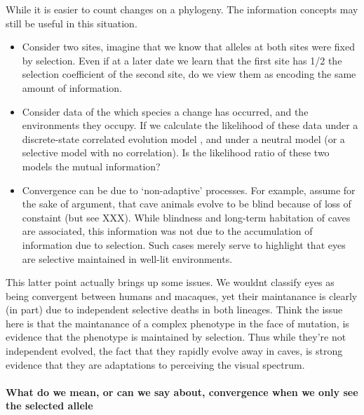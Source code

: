 \documentclass[a4paper,10pt]{article}
\begin{document}
While it is easier to count changes on a phylogeny. The information
concepts may still be useful in this situation.
\begin{itemize}
  \item Consider two sites, imagine that we know that alleles at both sites were
    fixed by selection. Even if at a later date we learn that the
    first site has 1/2 the selection coefficient of the second site,
    do we view them as encoding the same amount of information.
\item Consider data of the which species a change has occurred, and
  the environments they occupy. If we calculate the likelihood of these
  data under a discrete-state correlated evolution model
  \citep{pagel1994detecting}, and under a neutral model (or a
  selective model with no correlation). Is the likelihood ratio of
  these two models the mutual information? 
\item Convergence can be due to `non-adaptive' processes. For example,
  assume for the sake of argument, that  cave animals evolve to be blind because of loss of constaint (but see
  XXX). While blindness and long-term habitation of caves are
  associated, this information was not due to the accumulation of
  information due to selection. Such cases merely serve to highlight
  that eyes are selective maintained in well-lit environments. 
\end{itemize}

This latter point actually brings up some issues. We wouldnt classify
eyes as being convergent between humans and macaques, yet their
maintanance is clearly (in part) due to independent selective deaths
in both lineages. Think the issue here is that the maintanance of a
complex phenotype in the face of mutation, is evidence that the
phenotype is maintained by selection. Thus while they're not independent evolved, the
fact that they rapidly evolve away in caves, is strong evidence that they are
adaptations to perceiving the visual spectrum.

\paragraph{What do we mean, or can we say about, convergence when we only see the selected allele}
\end{document}

